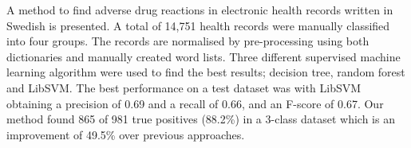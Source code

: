 A method to find adverse drug reactions in electronic health records written in Swedish is presented. A total of 14,751 health records were manually classified into four groups. The records are normalised by pre-processing using both dictionaries and manually created word lists. Three different supervised machine learning algorithm were used to find the best results; decision tree, random forest and LibSVM. The best performance on a test dataset was with LibSVM obtaining a precision of 0.69 and a recall of 0.66, and an F-score of 0.67. Our method found 865 of 981 true positives (88.2\%) in a 3-class dataset which is an improvement of 49.5\% over previous approaches.
